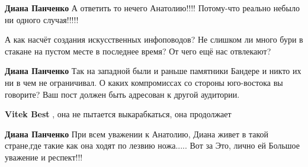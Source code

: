 \begin{itemize}
\begin{itemize}
 
\textbf{Диана Панченко} А ответить то нечего Анатолию!!!! Потому-что реально небыло ни одного случая!!!!!

 
А как насчёт создания искусственных инфоповодов? Не слишком ли много бури в стакане на пустом месте в последнее время? От чего ещё нас отвлекают?

 
\textbf{Диана Панченко} Так на западной были и раньше памятники Бандере и никто их ни в чем не ограничивал. О каких компромиссах со стороны юго-востока вы говорите? Ваш пост должен быть адресован к другой аудитории.

 
\textbf{Vitek Best} , она не пытается выкарабкаться, она продолжает

 
\textbf{Диана Панченко} При всем уважении к Анатолию, Диана живет в такой
стране,где такие как она ходят по лезвию ножа..... Вот за Это, лично ей Большое
уважение и респект!!!

 

\end{itemize}
\end{itemize}
